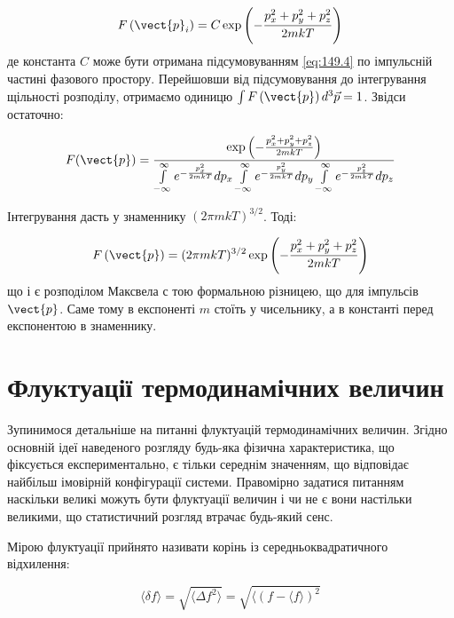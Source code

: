 \begin{equation}
	F\left({\vect{p}}_i\right)=C\exp{\left(-\frac{p_x^2+p_y^2+p_z^2}{2mkT}\right)}
	\label{eq:149.4}
\end{equation}
%
де константа $C$ може бути отримана підсумовуванням \eqref{eq:149.4} по імпульсній частині фазового простору. Перейшовши від підсумовування до інтегрування щільності розподілу, отримаємо одиницю $\int{F\left(\vect{p}\right)d^3\vec{p}=1}$. Звідси остаточно:

\begin{equation}
	F(\vect{p}) = \frac{\exp{\left(-\frac{p_x^2+p_y^2+p_z^2}{2mkT}\right)}}%
	{
		\int\limits_{-\infty}^{\infty} e^{-\frac{p_x^2}{2mkT} }dp_x
		\int\limits_{-\infty}^{\infty} e^{-\frac{p_y^2}{2mkT} }dp_y
		\int\limits_{-\infty}^{\infty} e^{-\frac{p_z^2}{2mkT} }dp_z
	}
	\label{eq:149.5}
\end{equation}

Інтегрування дасть у знаменнику $(2 \pi m k T)^{3/2}$. Тоді:

\begin{equation}
	F\left(\vect{p}\right)=(2 \pi m k T)^{3/2} \exp\left(-\frac{p_x^2+p_y^2+p_z^2}{2mkT}\right)
	\label{eq:149.6}
\end{equation}
%
що і є розподілом Максвела с тою формальною різницею, що для імпульсів $\vect{p}$. Саме тому в експоненті $m$ стоїть у чисельнику, а в константі перед експонентою в знаменнику.

\section{Флуктуації термодинамічних величин}

Зупинимося детальніше на питанні флуктуацій термодинамічних величин. Згідно основній ідеї наведеного розгляду будь-яка фізична характеристика, що фіксується експериментально, є тільки середнім значенням, що відповідає найбільш імовірній конфігурації системи. Правомірно задатися питанням наскільки великі можуть бути флуктуації величин і чи не є вони настільки великими, що статистичний розгляд втрачає будь-який сенс.

Мірою флуктуації прийнято називати корінь із середньоквадратичного відхилення:

\begin{equation}
	\langle \delta f\rangle = \sqrt{\langle \Delta f^2 \rangle} = \sqrt{ \langle (f  - \langle f \rangle)^2}
	\label{eq:150.1}
\end{equation}

